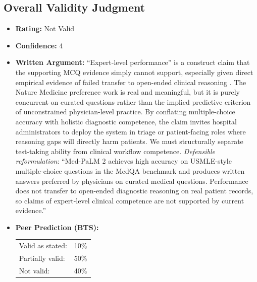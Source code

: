 \subsection{Overall Validity Judgment}
\begin{itemize}
    \item \textbf{Rating:} Not Valid
    \item \textbf{Confidence:} 4
    \item \textbf{Written Argument:} ``Expert-level performance'' is a construct claim that the supporting MCQ evidence simply cannot support, especially given direct empirical evidence of failed transfer to open-ended clinical reasoning \citep{alaa2025medical}. The Nature Medicine preference work is real and meaningful, but it is purely concurrent on curated questions rather than the implied predictive criterion of unconstrained physician-level practice. By conflating multiple-choice accuracy with holistic diagnostic competence, the claim invites hospital administrators to deploy the system in triage or patient-facing roles where reasoning gaps will directly harm patients. We must structurally separate test-taking ability from clinical workflow competence. \emph{Defensible reformulation}: ``Med-PaLM 2 achieves high accuracy on USMLE-style multiple-choice questions in the MedQA benchmark and produces written answers preferred by physicians on curated medical questions. Performance does not transfer to open-ended diagnostic reasoning on real patient records, so claims of expert-level clinical competence are not supported by current evidence.''
    \item \textbf{Peer Prediction (BTS):}

    \begin{tabular}{ll}
        Valid as stated: & 10\% \\
        Partially valid: & 50\% \\
        Not valid: & 40\% \\
        \end{tabular}\\[4pt]
\end{itemize}
